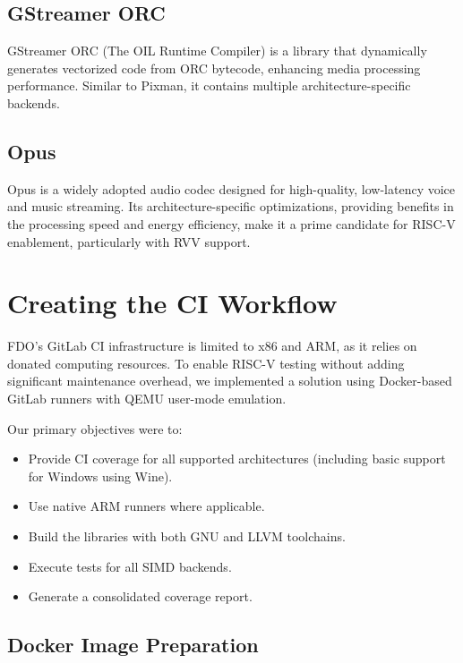 \documentclass[
	a4paper, %
	10pt, %
	unnumberedsections, %
	twoside, %
]{LTJournalArticle}
\begin{document}
\subsection{GStreamer ORC}

GStreamer ORC (The OIL Runtime Compiler)\autocite{orc} is a library that dynamically generates vectorized code from ORC bytecode, enhancing media processing performance. Similar to Pixman, it contains multiple architecture-specific backends.

\subsection{Opus}

Opus\autocite{rfc6716} is a widely adopted audio codec designed for high-quality, low-latency voice and music streaming. Its architecture-specific optimizations, providing benefits in the processing speed and energy efficiency, make it a prime candidate for RISC-V enablement, particularly with RVV support.

\section{Creating the CI Workflow}

FDO's GitLab CI infrastructure is limited to x86 and ARM, as it relies on donated computing resources. To enable RISC-V testing without adding significant maintenance overhead, we implemented a solution using Docker-based GitLab runners with QEMU user-mode emulation\autocite{dockerqemu}.

Our primary objectives were to:
\begin{itemize}
      \item Provide CI coverage for all supported architectures (including basic support for Windows using Wine).
      \item Use native ARM runners where applicable.
      \item Build the libraries with both GNU and LLVM toolchains.
      \item Execute tests for all SIMD backends.
      \item Generate a consolidated coverage report.
\end{itemize}

\subsection{Docker Image Preparation}
\end{document}
